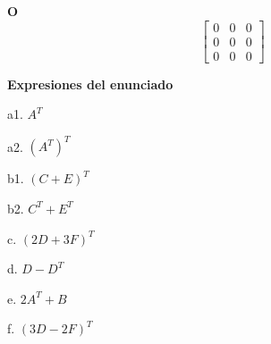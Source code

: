 \documentclass[11pt,a4paper,landscape]{article}
\begin{document}
\par\smallskip \begin{minipage}[t]{.47\linewidth}\centering \textbf{O}\[\begin{bmatrix}0 & 0 & 0\\0 & 0 & 0\\0 & 0 & 0\end{bmatrix}\]\end{minipage}\par\smallskip
\textbf{Expresiones del enunciado}\par
a1. \(A^T\)\par
a2. \((A^T)^T\)\par
b1. \((C+E)^T\)\par
b2. \(C^T+E^T\)\par
c. \((2D+3F)^T\)\par
d. \(D-D^T\)\par
e. \(2A^T+B\)\par
f. \((3D-2F)^T\)\par
\end{document}
